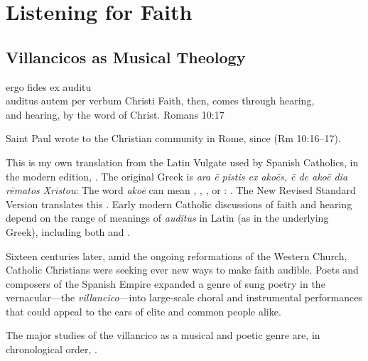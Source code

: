 % 

\part{Listening for Faith}
\label{part:faith}

\chapter{Villancicos as Musical Theology}
\label{ch:intro}

\epigraphTranslation
{ergo fides ex auditu\\
auditus autem per verbum Christi}
{Faith, then, comes through hearing, \\
and hearing, by the word of Christ.}
{Romans 10:17}

Saint Paul wrote to the Christian community in Rome,  since  (Rm 10:16--17).%
\begin{Footnote}
    This is my own translation from the Latin Vulgate used by Spanish Catholics, in
    the modern edition, \autocite{Weber:Vulgate}.
    The original Greek is \emph{ara ē pistis ex akoēs, ē de akoē dia rēmatos
    Xristou}: \autocite{Aland:GNT4}
    The word \emph{akoē} can mean , , , or : \autocite{BDAG}.
    The New Revised Standard Version translates this .
    Early modern Catholic discussions of faith and hearing depend on the range of
    meanings of \emph{auditus} in Latin (as in the underlying Greek), including both
     and .
\end{Footnote}
Sixteen centuries later, amid the ongoing reformations of the Western Church,
Catholic Christians were seeking ever new ways to make faith audible. 
Poets and composers of the Spanish Empire expanded a genre of sung poetry in the
vernacular---the \emph{villancico}---into large-scale choral and instrumental
performances that could appeal to the ears of elite and common people alike.%
\begin{Footnote}
    The major studies of the villancico as a musical and poetic genre are, in
    chronological order,
    \autocites{Rubio:Forma}{Laird:VC}{Torrente:PhD}{Tenorio:SorJuana}
    {CaberoPueyo:PhD}{Illari:Polychoral}{Knighton-Torrente:VCs}
    {Cashner:Cards}{Cashner:PhD}.
\end{Footnote}

